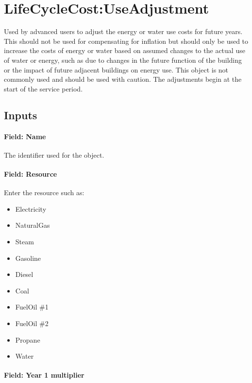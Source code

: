 \section{LifeCycleCost:UseAdjustment}\label{lifecyclecostuseadjustment}

Used by advanced users to adjust the energy or water use costs for future years. This should not be used for compensating for inflation but should only be used to increase the costs of energy or water based on assumed changes to the actual use of water or energy, such as due to changes in the future function of the building or the impact of future adjacent buildings on energy use. This object is not commonly used and should be used with caution. The adjustments begin at the start of the service period.

\subsection{Inputs}\label{inputs-060}

\paragraph{Field: Name}\label{field-name-058}

The identifier used for the object.

\paragraph{Field: Resource}\label{field-resource}

Enter the resource such as:

\begin{itemize}
\item
  Electricity
\item
  NaturalGas
\item
  Steam
\item
  Gasoline
\item
  Diesel
\item
  Coal
\item
  FuelOil \#1
\item
  FuelOil \#2
\item
  Propane
\item
  Water
\end{itemize}

\paragraph{Field: Year 1 multiplier}\label{field-year-1-multiplier}

